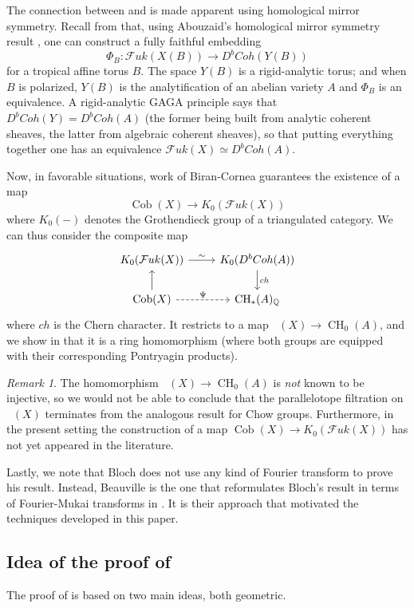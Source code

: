 \documentclass[10pt]{amsart}
\newcounter{mainthm}
\theoremstyle{definition}
\theoremstyle{remark}
\newtheorem{remark}[thm]{Remark}
\def\Q{\mathbb{Q}}
\DeclareMathOperator{\Cob}{Cob}
\DeclareMathOperator{\Cobfib}{\mathrm{Cob}_{\mathrm{fib}}}
\DeclareMathOperator{\CH}{CH}
\newcommand{\mcal}{\mathcal}
\begin{document}
The connection between  and  is made apparent using homological mirror symmetry.
Recall from  that, using Abouzaid's homological mirror symmetry result \cite{abouzaid2021homological}, one can construct a fully faithful embedding 
$$
\Phi_B : \mcal Fuk(X(B)) \to D^bCoh(Y(B))
$$
for a tropical affine torus $B$.
The space $Y(B)$ is a rigid-analytic torus; and when $B$ is polarized, $Y(B)$ is the analytification of an abelian variety $A$ and $\Phi_B$ is an equivalence.
A rigid-analytic GAGA principle says that $D^bCoh(Y) = D^bCoh(A)$ (the former being built from analytic coherent sheaves, the latter from algebraic coherent sheaves), so that putting everything together one has an equivalence $\mcal Fuk(X) \simeq D^bCoh(A)$.

Now, in favorable situations, work of Biran-Cornea \cite{biran2014lagrangian,biran2021lagrangian} guarantees the existence of a map 
$$
    \Cob(X) \to K_0(\mcal Fuk (X))
$$
where $K_0(-)$ denotes the Grothendieck group of a triangulated category.
We can thus consider the composite map 
$$
\begin{tikzcd}
    K_0(\mcal Fuk(X)) \arrow[r,"\sim"] & K_0(D^bCoh(A)) \arrow[d,"ch"] \\
    \Cob(X) \arrow[u] \arrow[r,dashed,"\Psi"] & \CH_*(A)_\Q
\end{tikzcd}
$$
where $ch$ is the Chern character.
It restricts to a map $\Cobfib(X) \to \CH_0(A)$, and we show in  that it is a ring homomorphism (where both groups are equipped with their corresponding Pontryagin products).

\begin{remark}
    The homomorphism $\Cobfib(X) \to \CH_0(A)$ is \emph{not} known to be injective, so we would not be able to conclude that the parallelotope filtration on $\Cobfib(X)$ terminates from the analogous result for Chow groups.
    Furthermore, in the present setting the construction of a map $\Cob(X) \to K_0(\mcal Fuk(X))$ has not yet appeared in the literature.
\end{remark}

Lastly, we note that Bloch does not use any kind of Fourier transform to prove his result.
Instead, Beauville is the one that reformulates Bloch's result in terms of Fourier-Mukai transforms in \cite{beauville2006quelques}.
It is their approach that motivated the techniques developed in this paper.


 
\subsection{Idea of the proof of }\label{sec:proof_sketch}
The proof of  is based on two main ideas, both geometric.
\end{document}

